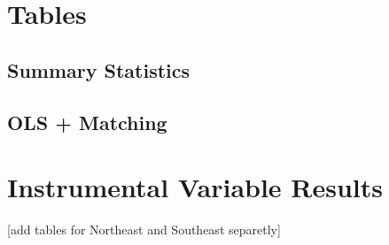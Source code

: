 \documentclass[11pt]{article}
\begin{document}
\clearpage

\section*{Tables}

\subsection*{Summary Statistics}



\clearpage


\subsection*{OLS + Matching}



\clearpage

\section*{Instrumental Variable Results}

%



\clearpage

%





\clearpage

[add tables for Northeast and Southeast separetly]
\end{document}
